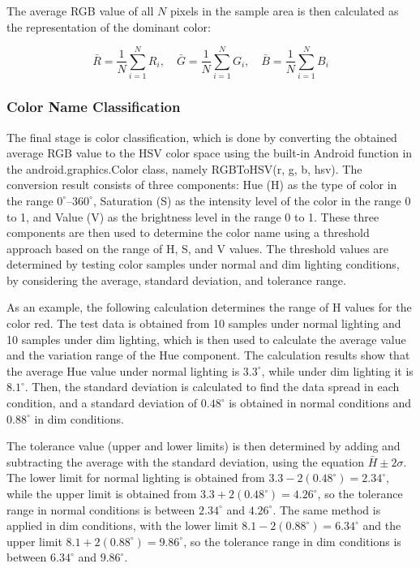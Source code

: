 The average RGB value of all $N$ pixels in the sample area is then calculated as the representation of the dominant color:

\begin{equation}
\bar{R} = \frac{1}{N}\sum_{i=1}^{N} R_i, \quad
\bar{G} = \frac{1}{N}\sum_{i=1}^{N} G_i, \quad
\bar{B} = \frac{1}{N}\sum_{i=1}^{N} B_i
\end{equation}

\subsubsection{Color Name Classification}

The final stage is color classification, which is done by converting the obtained average RGB value to the HSV color space using the built-in Android function in the android.graphics.Color class, namely RGBToHSV(r, g, b, hsv). The conversion result consists of three components: Hue (H) as the type of color in the range $0^\circ$--$360^\circ$, Saturation (S) as the intensity level of the color in the range 0 to 1, and Value (V) as the brightness level in the range 0 to 1. These three components are then used to determine the color name using a threshold approach based on the range of H, S, and V values. The threshold values are determined by testing color samples under normal and dim lighting conditions, by considering the average, standard deviation, and tolerance range.

As an example, the following calculation determines the range of H values for the color red. The test data is obtained from 10 samples under normal lighting and 10 samples under dim lighting, which is then used to calculate the average value and the variation range of the Hue component. The calculation results show that the average Hue value under normal lighting is $3.3^\circ$, while under dim lighting it is $8.1^\circ$. Then, the standard deviation is calculated to find the data spread in each condition, and a standard deviation of $0.48^\circ$ is obtained in normal conditions and $0.88^\circ$ in dim conditions.

The tolerance value (upper and lower limits) is then determined by adding and subtracting the average with the standard deviation, using the equation $\bar{H} \pm 2\sigma$. The lower limit for normal lighting is obtained from $3.3 - 2(0.48^\circ) = 2.34^\circ$, while the upper limit is obtained from $3.3 + 2(0.48^\circ) = 4.26^\circ$, so the tolerance range in normal conditions is between $2.34^\circ$ and $4.26^\circ$. The same method is applied in dim conditions, with the lower limit $8.1 - 2(0.88^\circ) = 6.34^\circ$ and the upper limit $8.1 + 2(0.88^\circ) = 9.86^\circ$, so the tolerance range in dim conditions is between $6.34^\circ$ and $9.86^\circ$.

